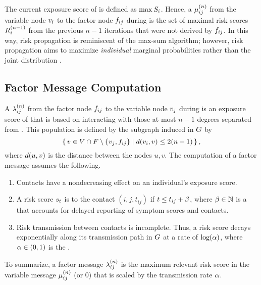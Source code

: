 The current exposure score of  is defined as $\max S_i$. Hence, a  $\mu_{ij}^{(n)}$ from the variable node $\vVariable[i]$ to the factor node $\vFactor[ij]$ during  is the set of maximal risk scores $\vIndexedExpScores{i}{n - 1}$ from the previous $n - 1$ iterations that were not derived by $\vFactor[ij]$. In this way, risk propagation is reminiscent of the max-sum algorithm; however, risk propagation aims to maximize \emph{individual} marginal probabilities rather than the joint distribution \cite[pp. 411--415]{Bishop2006}.

\subsection{Factor Message Computation}

\newcommand{\vMessageSet}{\vSet{M}}

A  $\lambda_{ij}^{(n)}$ from the factor node $\vFactor[ij]$ to the variable node $\vVariable[j]$ during  is an exposure score of  that is based on interacting with those at most $n - 1$ degrees separated from . This population is defined by the subgraph induced in $G$ by
%
\begin{equation*}
  \setBuilder{\vVariable \in \vVariables \cap \vFactors \setminus \{\vVariable[j], \vFactor[ij]\}}{\dist(\vVariable[i], \vVariable) \leq 2(n - 1)},
\end{equation*}
%
where $d(u, v)$ is the distance between the nodes $u, v$. The computation of a factor message assumes the following.
%
\begin{enumerate}
  \item Contacts have a nondecreasing effect on an individual's exposure score.
  \item A risk score $s_t$ is  to the contact $(i, j, t_{ij})$ if $t \leq t_{ij} +\beta$, where $\beta \in \mathbb{N}$ is a  that accounts for delayed reporting of symptom scores and contacts.
  \item Risk transmission between contacts is incomplete. Thus, a risk score decays exponentially along its transmission path in $G$ at a rate of $\log(\alpha)$, where $\alpha \in (0, 1)$ is the .
\end{enumerate}
%
To summarize, a factor message $\lambda_{ij}^{(n)}$ is the maximum relevant risk score in the variable message $\mu_{ij}^{(n)}$ (or 0) that is scaled by the transmission rate $\alpha$.

